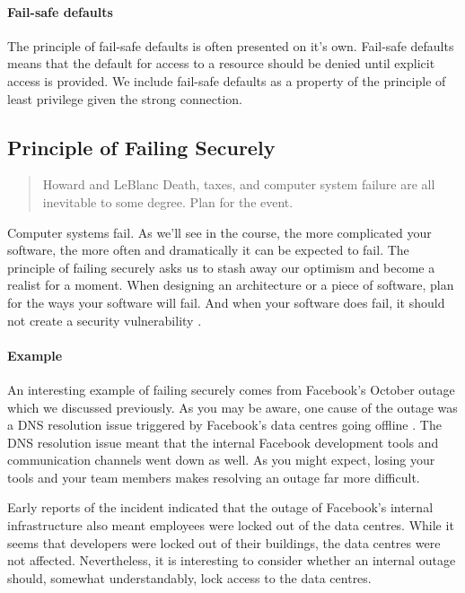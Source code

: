 \paragraph{Fail-safe defaults}
The principle of fail-safe defaults is often presented on it's own.
Fail-safe defaults means that the default for access to a resource should be denied until explicit access is provided.
We include fail-safe defaults as a property of the principle of least privilege given the strong connection.

\subsection{Principle of Failing Securely}

\begin{quote}{Howard and LeBlanc \cite{death-taxes-and-failure}}
Death, taxes, and computer system failure are all inevitable to some degree. Plan for the event.
\end{quote}

\noindent Computer systems fail.
As we'll see in the course, the more complicated your software, the more often and dramatically it can be expected to fail.
The principle of failing securely asks us to stash away our optimism and become a realist for a moment.
When designing an architecture or a piece of software, plan for the ways your software will fail.
And when your software does fail, it should not create a security vulnerability \cite{failing-securely}.

\paragraph{Example}
An interesting example of failing securely comes from Facebook's October outage which we discussed previously.
As you may be aware, one cause of the outage was a DNS resolution issue triggered by Facebook's data centres going offline \cite{facebook-outage}.
The DNS resolution issue meant that the internal Facebook development tools and communication channels went down as well.
As you might expect, losing your tools and your team members makes resolving an outage far more difficult.

Early reports of the incident indicated that the outage of Facebook's internal infrastructure also meant employees were locked out of the data centres.
While it seems that developers were locked out of their buildings, the data centres were not affected.
Nevertheless, it is interesting to consider whether an internal outage should, somewhat understandably, lock access to the data centres.

